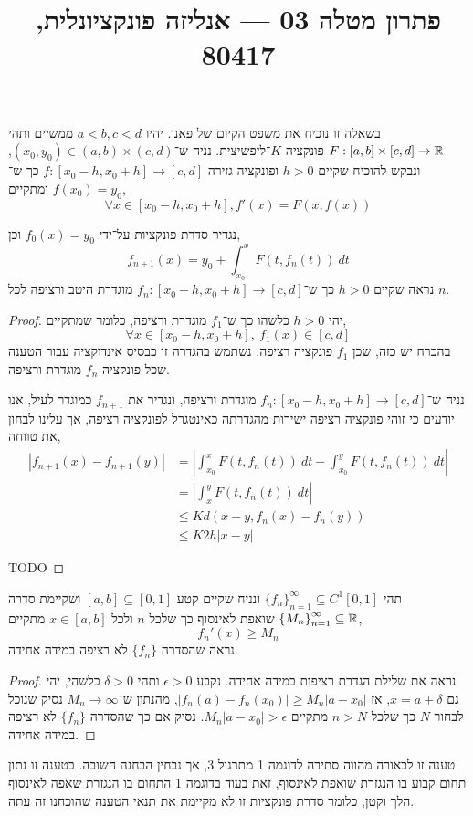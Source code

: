
\title{פתרון מטלה 03 --- אנליזה פונקציונלית, 80417}


\maketitle
\maketitleprint{}

\question{}
בשאלה זו נוכיח את משפט הקיום של פאנו.
יהיו $a < b, c < d$ ממשיים ותהי $F : [a, b] \times [c, d] \to \mathbb{R}$ פונקציה $K$־ליפשיצית.
נניח ש־$(x_{0}, y_{0}) \in (a, b) \times (c, d)$, ונבקש להוכיח שקיים $h > 0$ ופונקציה גזירה $f : [x_0 - h, x_0 + h] \to [c, d]$ כך ש־$f(x_0) = y_0$ ומתקיים,
\[
	\forall x \in [x_0 - h, x_0 + h], f'(x) = F(x, f(x))
\]

\subquestion{}
נגדיר סדרת פונקציות על־ידי $f_0(x) = y_0$ וכן,
\[
	f_{n + 1}(x) = y_0 + \int_{x_0}^{x} F(t, f_n(t))\ dt
\]
נראה שקיים $h > 0$ כך ש־$f_n : [x_0 - h, x_0 + h] \to [c, d]$ מוגדרת היטב ורציפה לכל $n$.
\begin{proof}
	יהי $h > 0$ כלשהו כך ש־$f_1$ מוגדרת ורציפה, כלומר שמתקיים,
	\[
		\forall x \in [x_0 - h, x_0 + h],\ 
		f_1(x) \in [c, d]
	\]
	בהכרח יש כזה, שכן $f_1$ פונקציה רציפה.
	נשתמש בהגדרה זו כבסיס אינדוקציה עבור הטענה שכל פונקציה $f_n$ מוגדרת ורציפה.

	נניח ש־$f_n : [x_0 - h, x_0 + h] \to [c, d]$ מוגדרת ורציפה, ונגדיר את $f_{n + 1}$ כמוגדר לעיל, אנו יודעים כי זוהי פונקציה רציפה ישירות מהגדרתה כאינטגרל לפונקציה רציפה, אך עלינו לבחון את טווחה,
	\begin{align*}
		|f_{n + 1}(x) - f_{n + 1}(y)|
		& = \left\lvert \int_{x_0}^{x} F(t, f_n(t))\ dt - \int_{x_0}^{y} F(t, f_n(t))\ dt \right\rvert \\
		& = \left\lvert \int_{x}^{y} F(t, f_n(t))\ dt \right\rvert \\
		& \le K d(x - y, f_n(x) - f_n(y)) \\
		& \le K 2h |x - y|
	\end{align*}

	TODO
\end{proof}

\question{}
תהי ${\{ f_n \}}_{n = 1}^\infty \subseteq C^1[0, 1]$ ונניח שקיים קטע $[a, b] \subseteq [0, 1]$ ושקיימת סדרה ${\{ M_n \}}_{n = 1}^\infty \subseteq \mathbb{R}$ שואפת לאינסוף כך שלכל $n$ ולכל $x \in [a, b]$ מתקיים,
\[
	f_n'(x) \ge M_n
\]
נראה שהסדרה $\{ f_n \}$ לא רציפה במידה אחידה.
\begin{proof}
	נראה את שלילת הגדרת רציפות במידה אחידה.
	נקבע $\epsilon > 0$ ותהי $\delta > 0$ כלשהי, יהי גם $x = a + \delta$, אז $|f_n(a) - f_n(x_0)| \ge M_n |a - x_0|$, מהנתון ש־$M_n \to \infty$ נסיק שנוכל לבחור $N$ כך שלכל $n > N$ מתקיים $M_n |a - x_0| > \epsilon$.
	נסיק אם כך שהסדרה $\{ f_n \}$ לא רציפה במידה אחידה.
\end{proof}
טענה זו לכאורה מהווה סתירה לדוגמה 1 מתרגול 3, אך נבחין הבחנה חשובה.
בטענה זו נתון תחום קבוע בו הנגזרת שואפת לאינסוף, זאת בעוד בדוגמה 1 התחום בו הנגזרת שאפה לאינסוף הלך וקטן, כלומר סדרת פונקציות זו לא מקיימת את תנאי הטענה שהוכחנו זה עתה.

